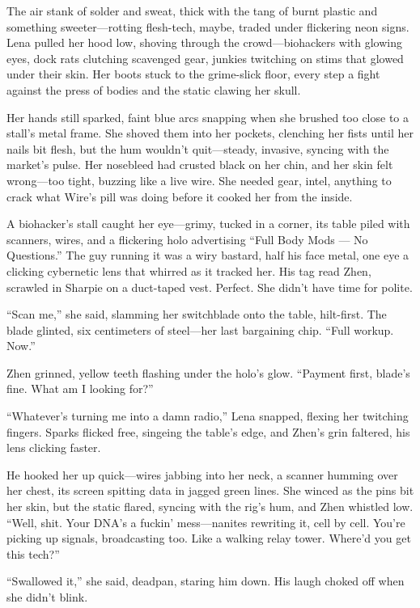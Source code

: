 \documentclass[12pt]{book}
\begin{document}
The air stank of solder and sweat, thick with the tang of burnt plastic and something sweeter---rotting flesh-tech, maybe, traded under flickering neon signs. Lena pulled her hood low, shoving through the crowd---biohackers with glowing eyes, dock rats clutching scavenged gear, junkies twitching on stims that glowed under their skin. Her boots stuck to the grime-slick floor, every step a fight against the press of bodies and the static clawing her skull.

Her hands still sparked, faint blue arcs snapping when she brushed too close to a stall’s metal frame. She shoved them into her pockets, clenching her fists until her nails bit flesh, but the hum wouldn’t quit---steady, invasive, syncing with the market’s pulse. Her nosebleed had crusted black on her chin, and her skin felt wrong---too tight, buzzing like a live wire. She needed gear, intel, anything to crack what Wire’s pill was doing before it cooked her from the inside.

A biohacker’s stall caught her eye---grimy, tucked in a corner, its table piled with scanners, wires, and a flickering holo advertising ``Full Body Mods --- No Questions.'' The guy running it was a wiry bastard, half his face metal, one eye a clicking cybernetic lens that whirred as it tracked her. His tag read Zhen, scrawled in Sharpie on a duct-taped vest. Perfect. She didn’t have time for polite.

``Scan me,'' she said, slamming her switchblade onto the table, hilt-first. The blade glinted, six centimeters of steel---her last bargaining chip. ``Full workup. Now.''

Zhen grinned, yellow teeth flashing under the holo’s glow. ``Payment first, blade’s fine. What am I looking for?''

``Whatever’s turning me into a damn radio,'' Lena snapped, flexing her twitching fingers. Sparks flicked free, singeing the table’s edge, and Zhen’s grin faltered, his lens clicking faster.

He hooked her up quick---wires jabbing into her neck, a scanner humming over her chest, its screen spitting data in jagged green lines. She winced as the pins bit her skin, but the static flared, syncing with the rig’s hum, and Zhen whistled low. ``Well, shit. Your DNA’s a fuckin’ mess---nanites rewriting it, cell by cell. You’re picking up signals, broadcasting too. Like a walking relay tower. Where’d you get this tech?''

``Swallowed it,'' she said, deadpan, staring him down. His laugh choked off when she didn’t blink.
\end{document}

